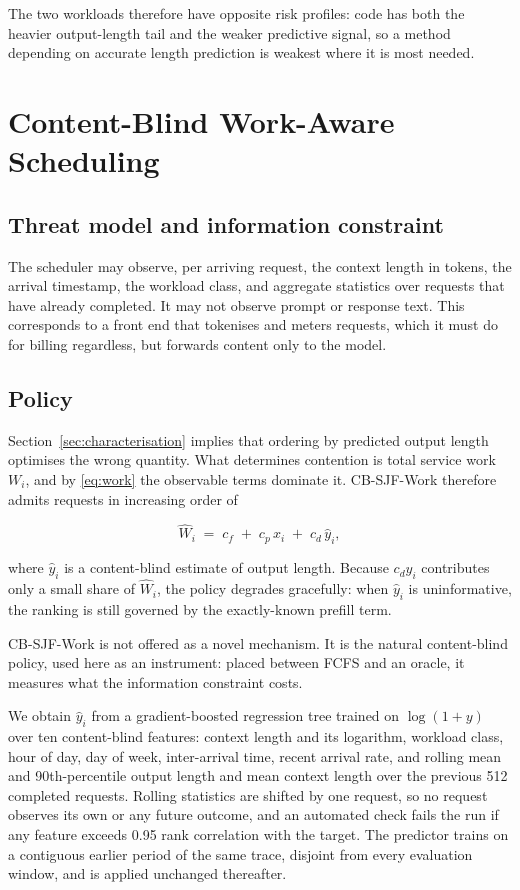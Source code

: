 \documentclass[conference,10pt,letterpaper]{IEEEtran}
\begin{document}
The two workloads therefore have opposite risk profiles: code has both the
heavier output-length tail and the weaker predictive signal, so a method
depending on accurate length prediction is weakest where it is most needed.

\section{Content-Blind Work-Aware Scheduling}
\label{sec:method}

\subsection{Threat model and information constraint}
The scheduler may observe, per arriving request, the context length in tokens,
the arrival timestamp, the workload class, and aggregate statistics over
requests that have already completed. It may not observe prompt or response
text. This corresponds to a front end that tokenises and meters requests, which
it must do for billing regardless, but forwards content only to the model.

\subsection{Policy}
Section~\ref{sec:characterisation} implies that ordering by predicted output
length optimises the wrong quantity. What determines contention is total service
work $W_i$, and by \eqref{eq:work} the observable terms dominate it.
CB-SJF-Work therefore admits requests in increasing order of

\begin{equation}
  \label{eq:key}
  \widehat{W}_i \;=\; c_f \;+\; c_p\,x_i \;+\; c_d\,\hat{y}_i ,
\end{equation}

\noindent where $\hat{y}_i$ is a content-blind estimate of output length. Because
$c_d \hat{y}_i$ contributes only a small share of $\widehat{W}_i$, the policy
degrades gracefully: when $\hat{y}_i$ is uninformative, the ranking is still
governed by the exactly-known prefill term.

CB-SJF-Work is not offered as a novel mechanism. It is the natural content-blind
policy, used here as an instrument: placed between FCFS and an oracle, it
measures what the information constraint costs.

We obtain $\hat{y}_i$ from a gradient-boosted regression tree trained on
$\log(1+y)$ over ten content-blind features: context length and its logarithm,
workload class, hour of day, day of week, inter-arrival time, recent arrival
rate, and rolling mean and 90th-percentile output length and mean context length
over the previous 512 completed requests. Rolling statistics are shifted by one
request, so no request observes its own or any future outcome, and an automated
check fails the run if any feature exceeds 0.95 rank correlation with the
target. The predictor trains on a contiguous earlier period of the same trace,
disjoint from every evaluation window, and is applied unchanged thereafter.
\end{document}
